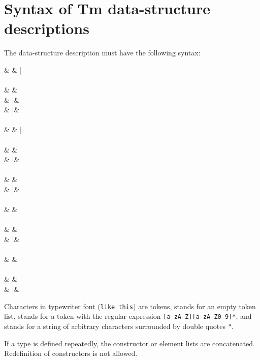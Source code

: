 \chapter{Syntax of Tm data-structure descriptions}
\label{s.dsgram}
The data-structure description must have the following syntax:
\begin{grammar}
 & \produces & \emptystring \bar {}   \\
\\
 & \produces &  \term{::=}   \term{{\tt ;}} \\
 & \bar &  \term{==}  \term{(}  \term{)} \term{;} \\
 & \bar &   \term{;} \\
\\
 & \produces & \emptystring \bar {} \term{+}  \\
\\
 & \produces &   \\
& \bar &  \term{,}  \\
\\
 & \produces &   \\
& \bar &  \term{|}   \\
\\
 & \produces &   \\
\\
 & \produces & \emptystring \\
& \bar &    \\
\\
 & \produces &  \term{:}  \\
\\
 & \produces &  \\
& \bar & \term{[}  \term{]} \\
\end{grammar}
Characters in typewriter font ({\tt like this}) are tokens,
{\emptystring} stands for an empty token list,
 stands for a token with the regular expression
\verb![a-zA-Z][a-zA-Z0-9]*!,
and  stands for a string of arbitrary characters
surrounded by double quotes \verb+"+.
\par
If a type is defined repeatedly, the constructor or element lists
are concatenated. Redefinition of constructors is not allowed.
